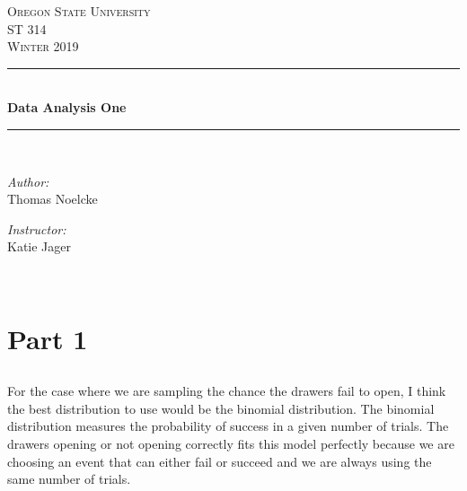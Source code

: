 \documentclass[letterpaper, onecolumn,10pt]{IEEEtran}
\begin{document}
    \begin{titlepage}
    \newcommand{\HRule}{\rule{\linewidth}{0.5mm}}
    \center
    \textsc{\Large Oregon State University}\\[1.5cm]
    \textsc{\Large ST 314}\\[0.5cm]
    \textsc{\Large Winter 2019}\\[0.5cm]
    \HRule \\[0.4cm]
    { \huge \bfseries Data Analysis One}\\[0.4cm] %
    \HRule \\[1.5cm]
    \begin{minipage}{0.4\textwidth}
        \begin{flushleft} \large
        \emph{Author:}\\
        Thomas Noelcke
        \end{flushleft}
    \end{minipage}
    \begin{minipage}{0.4\textwidth}
        \begin{flushright} \large
        \emph{Instructor:} \\
        Katie Jager\\
        \end{flushright}
    \end{minipage}\\[2cm]
		\end{titlepage}
        
        \iffalse
            Part 1. (8 points) For each random variable:
            (1 point) State whether the random variable should be modeled with a Binomial or a Poisson distribution.
            (1 point) Explain your reasoning.
            (1 point) State the parameter values that describe the distribution.
            (1 point) Give the specific probability mass function. 
        \fi
		\section{Part 1}
		    \subsection{}
		        \paragraph{}
		        For the case where we are sampling the chance the drawers fail to open, I think the best distribution to use would be the binomial distribution. The binomial distribution measures the probability of success in a given number of trials. The drawers opening or not opening correctly fits this model perfectly because we are choosing an event that can either fail or succeed and we are always using the same number of trials.\\
		        
\end{document}
